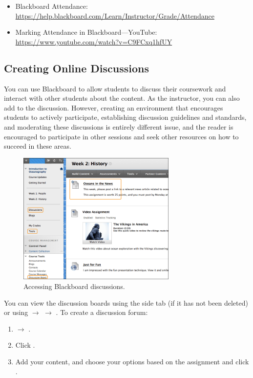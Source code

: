 	\begin{itemize}
	\item Blackboard Attendance: \url{https://help.blackboard.com/Learn/Instructor/Grade/Attendance}
	\item Marking Attendance in Blackboard---YouTube: \url{https://www.youtube.com/watch?v=C9FCxq1hfUY}
	\end{itemize}



\subsection{Creating Online Discussions}

You can use Blackboard to allow students to discuss their coursework and interact with other students about the content. As the instructor, you can also add to the discussion. However, creating an environment that encourages students to actively participate, establishing discussion guidelines and standards, and moderating these discussions is entirely different issue, and the reader is encouraged to participate in other sessions and seek other resources on how to succeed in these areas. 

	\begin{figure}[!ht]
	\centering
	\includegraphics[width=0.7\textwidth]{sections/blackboard/images/discussions_access.png}
	\caption{Accessing Blackboard discussions.}
	\end{figure}
	
You can view the discussion boards using the side  tab (if it has not been deleted) or using  $\to$  $\to$ . To create a discussion forum:
	
	\begin{enumerate}[1.]
	\item {} $\to$ .
	\item Click . 
	\item Add your content, and choose your options based on the assignment and click . 
	\end{enumerate} 

